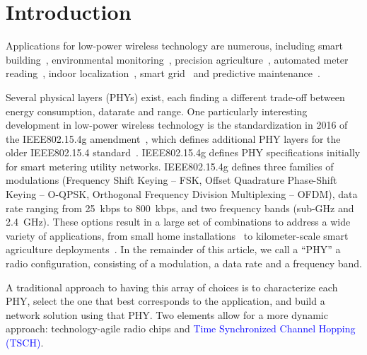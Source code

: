 \documentclass[sensors,article,submit,moreauthors,pdftex]{Definitions/mdpi}
\newcommand{\update}[1]     {\textcolor{blue}{#1}}
\begin{document}
\section{Introduction}
\label{sec:introduction}


Applications for low-power wireless technology are numerous, including
    smart building~\cite{munoz18overview,kazmi14review},
    environmental monitoring~\cite{munoz18evaluation},
    precision agriculture~\cite{watteyne16peach},
    automated meter reading~\cite{sum17experimental},
    indoor localization~\cite{tanaka20blink},
    smart grid~\cite{fadel15survey} and
    predictive maintenance~\cite{civerchia17industrial}.


Several physical layers (PHYs) exist, each finding a different trade-off between
    energy consumption,
    datarate and
    range.
One particularly interesting development in low-power wireless technology is the standardization in 2016 of the IEEE802.15.4g amendment~\cite{std_ieee802154g}, which defines additional PHY layers for the older IEEE802.15.4 standard~\cite{std_ieee802154}.
IEEE802.15.4g defines PHY specifications initially for smart metering utility networks.
IEEE802.15.4g defines
    three families of modulations (Frequency Shift Keying -- FSK,  Offset Quadrature Phase-Shift Keying -- O-QPSK, Orthogonal Frequency Division Multiplexing -- OFDM),
    data rate ranging from 25~kbps to 800~kbps, and
    two frequency bands (sub-GHz and 2.4~GHz).
These options result in a large set of combinations to address a wide variety of applications, from
    small home installations~\cite{tuset19experimental} to
    kilometer-scale smart agriculture deployments~\cite{munoz19km}.
In the remainder of this article, we call a ``PHY'' a radio configuration, consisting of
    a modulation,
    a data rate and
    a frequency band.


A traditional approach to having this array of choices is to
    characterize each PHY,
    select the one that best corresponds to the application, and
    build a network solution using that PHY.
Two elements allow for a more dynamic approach:
    technology-agile radio chips and
    \update{Time Synchronized Channel Hopping (TSCH)}.

\end{document}
